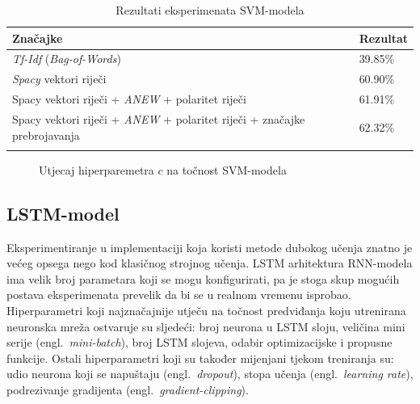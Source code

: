 \documentclass[times, utf8, zavrsni]{fer}
\begin{document}
\begin{table}[h]
\centering
\begin{tabular}{|l|l|} 
\hline
\small{Značajke}  &\small{Rezultat}       \\ 
\hline
\small{\emph{Tf-Idf} (\emph{Bag-of-Words})}& 39.85\% \\ 
\hline
\small{\emph{Spacy} vektori riječi}  & 60.90\%  \\ 
\hline
\small{{Spacy} vektori riječi + \emph{ANEW} + polaritet riječi}  & 61.91\%   \\ 
\hline
\small{{Spacy} vektori riječi + \emph{ANEW} + polaritet riječi + značajke prebrojavanja}  & 62.32\%   \\ 
\hline
\multicolumn{1}{l}{}  & \multicolumn{1}{l}{} 
\end{tabular}
\caption{Rezultati eksperimenata \gls{SVM}-modela}
\label{tablesvm}
\end{table}

\begin{figure}
\centering
{}
\caption{Utjecaj hiperparemetra $c$ na točnost SVM-modela}
\label{tablec}
\end{figure}

\subsection{\gls{LSTM}-model}

Eksperimentiranje u implementaciji koja koristi metode dubokog učenja znatno je većeg opsega nego kod klasičnog strojnog učenja. \gls{LSTM} arhitektura \gls{RNN}-modela ima velik broj parametara koji se mogu konfigurirati, pa je stoga skup mogućih postava eksperimenata prevelik da bi se u realnom vremenu isprobao. Hiperparametri koji najznačajnije utječu na točnost predviđanja koju utrenirana neuronska mreža ostvaruje su sljedeći: broj neurona u \gls{LSTM} sloju, veličina mini serije (engl.~\emph{mini-batch}), broj \gls{LSTM} slojeva, odabir optimizacijske i propusne funkcije. Ostali hiperparametri koji su također mijenjani tjekom treniranja su: udio neurona koji se napuštaju (engl.~\emph{dropout}), stopa učenja (engl.~\emph{learning rate}), podrezivanje gradijenta (engl.~\emph{gradient-clipping}).
\end{document}
